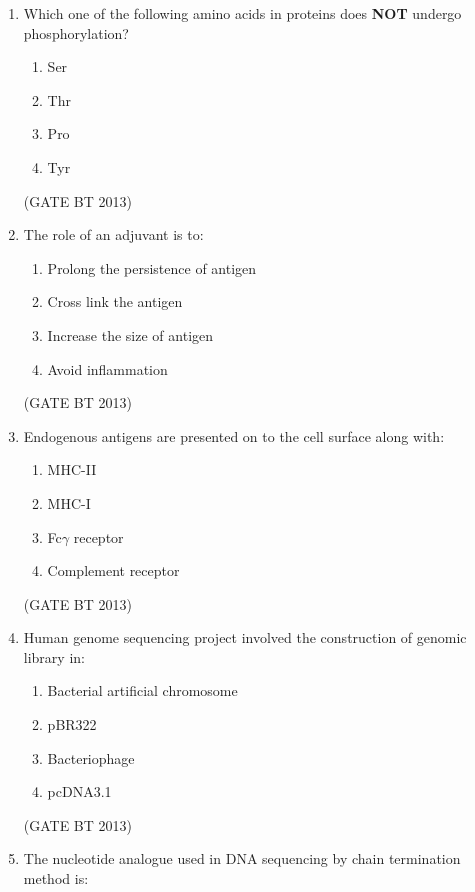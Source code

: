 \documentclass[journal,12pt,onecolumn]{IEEEtran}
\theoremstyle{remark}
\begin{document}
\begin{enumerate}
\item Which one of the following amino acids in proteins does \textbf{NOT} undergo phosphorylation?

\begin{enumerate}[label=(\Alph*)]
    \item Ser 
    \item Thr
    \item Pro
    \item Tyr
\end{enumerate} 
\hfill (GATE BT 2013)

\item 

The role of an adjuvant is to: 

\begin{enumerate}[label=(\Alph*)]
    \item Prolong the persistence of antigen
    \item Cross link the antigen
    \item Increase the size of antigen
    \item Avoid inflammation
\end{enumerate} 
\hfill (GATE BT 2013)

\item

Endogenous antigens are presented on to the cell surface along with:

\begin{enumerate}[label=(\Alph*)]
    \item MHC-II
    \item MHC-I
    \item Fc$\gamma$ receptor
    \item Complement receptor
\end{enumerate} 
\hfill (GATE BT 2013)
\item

Human genome sequencing project involved the construction of genomic library in:

\begin{enumerate}[label=(\Alph*)]
    \item Bacterial artificial chromosome
    \item pBR322
    \item Bacteriophage
    \item pcDNA3.1
\end{enumerate} 
\hfill (GATE BT 2013)
\item 

The nucleotide analogue used in DNA sequencing by chain termination method is:


\end{enumerate}
\end{document}
